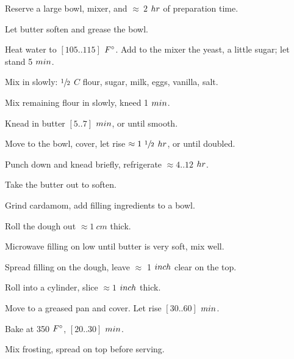 \begin{preparation}
\item Reserve a large bowl, mixer, and $\approx~2$ $\hour$ of preparation time.
\item Let butter soften and grease the bowl.
\item Heat water to $[105 .. 115]$ $\Fahrenheit$.
    Add to the mixer the yeast, a little sugar; let stand 5 $\minute$.
\item Mix in slowly: $\onehalf$ $C$ flour, sugar, milk, eggs, vanilla, salt.
\item Mix remaining flour in slowly, kneed 1 $\minute$.
\item Knead in butter $[5 .. 7]$ $\minute$, or until smooth.
\item Move to the bowl, cover, let rise $\approx1~\onehalf$ $\hour$, or until doubled.
\item Punch down and knead briefly, refrigerate $\approx4..12$ $\hour$.
\item Take the butter out to soften.
\item Grind cardamom, add filling ingredients to a bowl.
\item Roll the dough out $\approx1~cm$ thick.
\item Microwave filling on low until butter is very soft, mix well.
\item Spread filling on the dough, leave $\approx$ 1 $\inch$ clear on the top.
\item Roll into a cylinder, slice $\approx1$ $\inch$ thick.
\item Move to a greased pan and cover.
    Let rise $[30..60]$ $\minute$.
\item Bake at 350 $\Fahrenheit$, $[20..30]$ $\minute$.
\item Mix frosting, spread on top before serving.
\end{preparation}

\recipeend%
